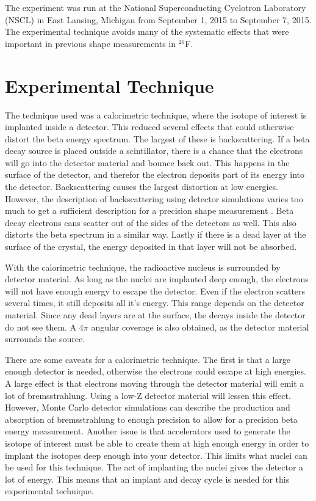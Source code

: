 \documentclass[../MaxHughesThesis.tex]{subfiles}
\begin{document}
The experiment was run at the National Superconducting Cyclotron Laboratory (NSCL) in East Lansing, Michigan from September 1, 2015 to September 7, 2015.
The experimental technique avoids many of the systematic effects that were important in previous shape measurements in  $^{20}$F.

\section{Experimental Technique}
The technique used was a calorimetric technique, where the isotope of interest is implanted inside a detector.
This reduced several effects that could otherwise distort the beta energy spectrum.
The largest of these is backscattering.
If a beta decay source is placed outside a scintillator, there is a chance that the electrons will go into the detector material and bounce back out.
This happens in the surface of the detector, and therefor the electron deposits part of its energy into the detector. 
Backscattering causes the largest distortion at low energies.
However, the description of backscattering using detector simulations varies too much to get a sufficient description for a precision shape measurement \cite{Huy18}.
Beta decay electrons cans scatter out of the sides of the detectors as well. 
This also distorts the beta spectrum in a similar way. 
Lastly if there is a dead layer at the surface of the crystal, the energy deposited in that layer will not be absorbed.

With the calorimetric technique, the radioactive nucleus is surrounded by detector material.
As long as the nuclei are implanted deep enough, the electrons will not have enough energy to escape the detector.
Even if the electron scatters several times, it still deposits all it's energy.
This range depends on the detector material.
Since any dead layers are at the surface, the decays inside the detector do not see them.
A $4\pi$ angular coverage is also obtained, as the detector material surrounds the source.

There are some caveats for a calorimetric technique. 
The first is that a large enough detector is needed, otherwise the electrons could escape at high energies.
A large effect is that electrons moving through the detector material will emit a lot of bremsstrahlung.
Using a low-Z detector material will lessen this effect.
However, Monte Carlo detector simulations can describe the production and absorption of bremsstrahlung to enough precision to allow for a precision beta energy measurement. 
Another issue is that accelerators used to generate the isotope of interest must be able to create them at high enough energy in order to implant the isotopes deep enough into your detector.
This limits what nuclei can be used for this technique.
The act of implanting the nuclei gives the detector a lot of energy. 
This means that an implant and decay cycle is needed for this experimental technique.
\end{document}
